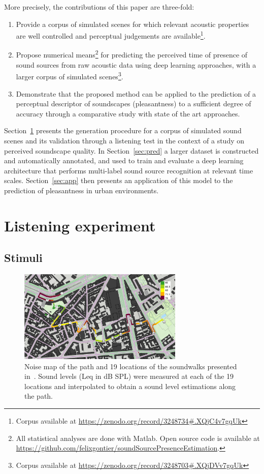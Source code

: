 \documentclass[twocolumn]{article}
\begin{document}
More precisely, the contributions of this paper are three-fold:
\begin{enumerate}
  \item Provide a corpus of simulated scenes for which relevant acoustic properties are well controlled and perceptual judgements are available\footnote{Corpus available at \url{https://zenodo.org/record/3248734\#.XQjC4v7gqUk}}.
  \item Propose numerical means\footnote{All statistical analyses are done with Matlab. Open source code is available at \url{https://github.com/felixgontier/soundSourcePresenceEstimation}.} for predicting the perceived time of presence of sound sources from raw acoustic data using deep learning approaches, with a larger corpus of simulated scenes\footnote{Corpus available at \url{https://zenodo.org/record/3248703\#.XQjDVv7gqUk}}.
  \item Demonstrate that the proposed method can be applied to the prediction of a perceptual descriptor of soundscapes (pleasantness) to a sufficient degree of accuracy through a comparative study with state of the art approaches.
\end{enumerate}

Section~\ref{sec:exp} presents the generation procedure for a corpus of simulated sound scenes and its validation through a listening test in the context of a study on perceived soundscape quality. In Section~\ref{sec:pred} a larger dataset is constructed and automatically annotated, and used to train and evaluate a deep learning architecture that performs multi-label sound source recognition at relevant time scales. Section~\ref{sec:app} then presents an application of this model to the prediction of pleasantness in urban environments.

\section{Listening experiment}
\label{sec:exp}

\subsection{Stimuli}
\label{sec:exp_stim}

\begin{figure}[t!]
    \centering
    \includegraphics[width=0.7\textwidth]{figures/parcours.png}
    \caption{Noise map of the path and 19 locations of the soundwalks presented in~\cite{aumond2017}. Sound levels (Leq in dB SPL) were measured at each of the 19 locations and interpolated to obtain a sound level estimations along the path.}\label{fig:path}
\end{figure}
\end{document}
